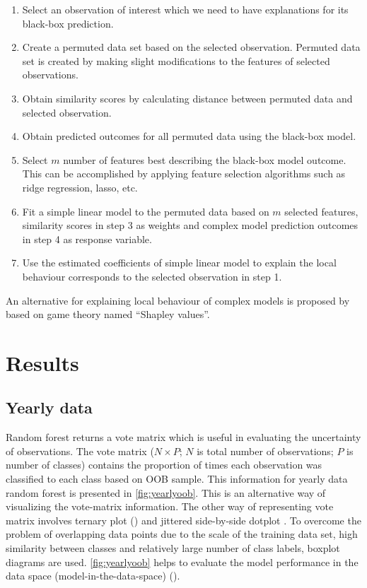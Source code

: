 \documentclass[11pt,a4paper,]{article}
\providecommand{\tightlist}{%
  \setlength{\itemsep}{0pt}\setlength{\parskip}{0pt}}
\begin{document}
\begin{enumerate}
\def\labelenumi{\arabic{enumi}.}
\tightlist
\item
  Select an observation of interest which we need to have explanations
  for its black-box prediction.
\item
  Create a permuted data set based on the selected observation. Permuted
  data set is created by making slight modifications to the features of
  selected observations.
\item
  Obtain similarity scores by calculating distance between permuted data
  and selected observation.
\item
  Obtain predicted outcomes for all permuted data using the black-box
  model.
\item
  Select \(m\) number of features best describing the black-box model
  outcome. This can be accomplished by applying feature selection
  algorithms such as ridge regression, lasso, etc.
\item
  Fit a simple linear model to the permuted data based on \(m\) selected
  features, similarity scores in step 3 as weights and complex model
  prediction outcomes in step 4 as response variable.
\item
  Use the estimated coefficients of simple linear model to explain the
  local behaviour corresponds to the selected observation in step 1.
\end{enumerate}

An alternative for explaining local behaviour of complex models is
proposed by \textcite{lundberg2017unified} based on game theory named
``Shapley values''.

\section{Results}\label{results}

\subsection{Yearly data}\label{yearly-data}

Random forest returns a vote matrix which is useful in evaluating the
uncertainty of observations. The vote matrix (\(N \times P\); \(N\) is
total number of observations; \(P\) is number of classes) contains the
proportion of times each observation was classified to each class based
on OOB sample. This information for yearly data random forest is
presented in \autoref{fig:yearlyoob}. This is an alternative way of
visualizing the vote-matrix information. The other way of representing
vote matrix involves ternary plot (\textcite{sutherland2000orca}) and
jittered side-by-side dotplot
\autocites{ehrlinger2015ggrandomforests}{da2017interactive}. To overcome
the problem of overlapping data points due to the scale of the training
data set, high similarity between classes and relatively large number of
class labels, boxplot diagrams are used. \autoref{fig:yearlyoob} helps
to evaluate the model performance in the data space
(model-in-the-data-space) (\textcite{da2017interactive}).
\end{document}
